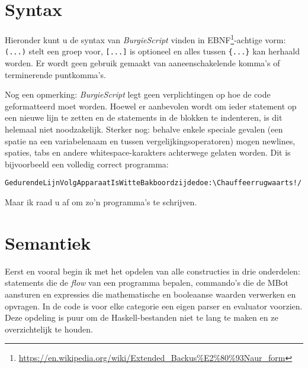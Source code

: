 \documentclass[11pt]{article}
\begin{document}
\section{Syntax}
Hieronder kunt u de syntax van \textit{BurgieScript} vinden in EBNF\footnote{\url{https://en.wikipedia.org/wiki/Extended_Backus\%E2\%80\%93Naur_form}}-achtige vorm: \texttt{(...)} stelt een groep voor, \texttt{[...]} is optioneel en alles tussen \texttt{\{...\}} kan herhaald worden. Er wordt geen gebruik gemaakt van aaneenschakelende komma's of terminerende puntkomma's.


Nog een opmerking: \textit{BurgieScript} legt geen verplichtingen op hoe de code geformatteerd moet worden. Hoewel er aanbevolen wordt om ieder statement op een nieuwe lijn te zetten en de statements in de blokken te indenteren, is dit helemaal niet noodzakelijk. Sterker nog: behalve enkele speciale gevalen (een spatie na een variabelenaam en tussen vergelijkingsoperatoren) mogen newlines, spaties, tabs en andere whitespace-karakters achterwege gelaten worden. Dit is bijvoorbeeld een volledig correct programma:
\lstset{numbers=none}
\begin{lstlisting}
GedurendeLijnVolgApparaatIsWitteBakboordzijdedoe:\Chauffeerrugwaarts!/
\end{lstlisting}
Maar ik raad u af om zo'n programma's te schrijven.

\section{Semantiek}
Eerst en vooral begin ik met het opdelen van alle constructies in drie onderdelen:
statements die de \textit{flow} van een programma bepalen, commando's die de MBot aansturen en expressies die mathematische en booleaanse waarden verwerken en opvragen. In de code is voor elke categorie een eigen parser en evaluator voorzien. Deze opdeling is puur om de Haskell-bestanden niet te lang te maken en ze overzichtelijk te houden.
\end{document}
